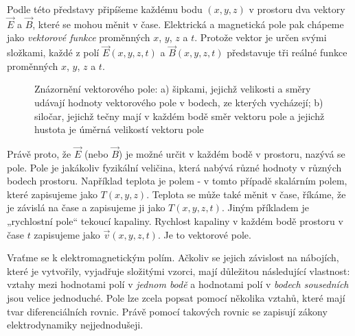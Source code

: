      Podle této představy připíšeme každému bodu \((x, y, z)\) v prostoru dva vektory \(\vec{E}\) 
      a \(\vec{B}\), které se mohou měnit v čase. Elektrická a magnetická pole pak chápeme jako 
      \emph{vektorové funkce} proměnných \(x\), \(y\), \(z\) a \(t\). Protože vektor je určen svými 
      složkami, každé z polí \(\vec{E}(x, y, z, t)\) a \(\vec{B}(x, y, z, t)\) představuje tři 
      reálné funkce proměnných \(x\), \(y\), \(z\) a \(t\).
      
      \begin{figure}[ht!]
        \centering
        \caption{Znázornění vektorového pole: a) šipkami, jejichž velikosti a směry  udávají
                hodnoty vektorového pole v bodech, ze kterých vycházejí; b) siločar, jejichž tečny
                mají v každém bodě směr vektoru pole a jejichž hustota je úměrná velikostí vektoru
                pole \cite[s.~17]{Feynman02}}
        \label{fyz:fig0146}
      \end{figure} 
      Právě proto, že \(\vec{E}\) (nebo \(\vec{B}\)) je možné určit v každém bodě v prostoru, 
      nazývá se pole. Pole je jakákoliv fyzikální veličina, která nabývá různé hodnoty v různých 
      bodech prostoru. Například teplota je polem - v tomto případě skalárním polem, které 
      zapisujeme jako \(T(x, y, z)\). Teplota se může také měnit v čase, říkáme, že je závislá na 
      čase a zapisujeme ji jako \(T(x, y, z, t)\). Jiným příkladem  je „rychlostní pole“ tekoucí 
      kapaliny. Rychlost kapaliny v každém bodě prostoru v čase \(t\) zapisujeme jako \(\vec{v}(x, 
      y, z, t)\). Je to vektorové pole.
    
      Vraťme se k elektromagnetickým polím. Ačkoliv se jejich závislost na nábojích, které je 
      vytvořily, vyjadřuje složitými vzorci, mají důležitou následující vlastnost: vztahy mezi 
      hodnotami polí v \emph{jednom bodě} a hodnotami polí v \emph{bodech sousedních} jsou velice 
      jednoduché. Pole lze zcela popsat pomocí několika vztahů, které mají tvar diferenciálních 
      rovnic. Právě pomocí takových rovnic se zapisují zákony elektrodynamiky nejjednodušeji.
    
